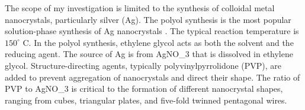 
The scope of my investigation is limited to the synthesis of colloidal metal nanocrystals, particularly silver (Ag).
The polyol synthesis is the most popular solution-phase synthesis of Ag nanocrystals \cite{Skrabalak_2007}.
The typical reaction temperature is $150^{\circ}$ C.
In the polyol synthesis, ethylene glycol acts as both the solvent and the reducing agent.
The source of Ag is from AgNO_3 that is dissolved in ethylene glycol.
Structure-directing agents, typically polyvinylpyrrolidone (PVP), are added to prevent aggregation of nanocrystals and direct their shape.
The ratio of PVP to AgNO_3 is critical to the formation of different nanocrystal shapes, ranging from cubes, triangular plates, and five-fold twinned pentagonal wires.

